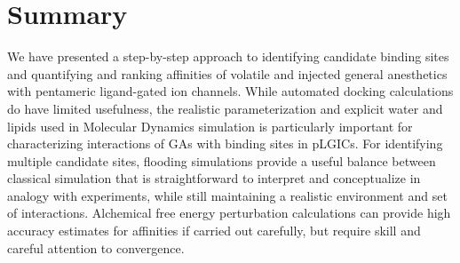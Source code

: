 \documentclass[12pt]{article}
\begin{document}
\section*{Summary}
We have presented a step-by-step approach to identifying candidate binding sites and quantifying and ranking affinities of volatile and injected general anesthetics with pentameric ligand-gated ion channels. While automated docking calculations do have limited usefulness, the realistic parameterization and explicit water and lipids used in Molecular Dynamics simulation is particularly important for characterizing interactions of GAs with binding sites in pLGICs. For identifying multiple candidate sites,  flooding simulations provide a useful balance between classical simulation that is straightforward to interpret and conceptualize in analogy with experiments, while still maintaining a realistic environment and set of interactions.  Alchemical free energy perturbation calculations can provide high accuracy estimates for affinities if carried out carefully, but require skill and careful attention to convergence.  


\end{document}
